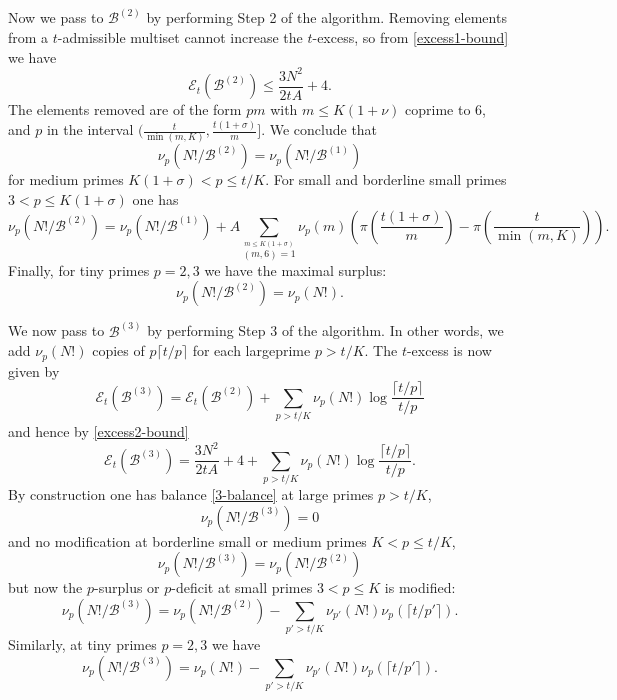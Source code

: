 \documentclass[12pt,a4paper,reqno]{amsart}
\numberwithin{equation}{section}
\theoremstyle{plain}
\theoremstyle{definition}
\newcommand\tuple{{\mathcal B}}
\newcommand\excess{{\mathcal{E}}}
\begin{document}
Now we pass to $\tuple^{(2)}$ by performing Step 2 of the algorithm.  Removing elements from a $t$-admissible multiset cannot increase the $t$-excess, so from \eqref{excess1-bound} we have
\begin{equation}\label{excess2-bound} 
  \excess_t(\tuple^{(2)}) \leq \frac{3N^2}{2tA} + 4.
\end{equation}
The elements removed are of the form $pm$ with $m \leq K(1+\nu)$ coprime to $6$, and $p$ in the interval $(\frac{t}{\min(m,K)}, \frac{t(1+\sigma)}{m}]$.  We conclude that
\begin{equation}\label{nup-21}
   \nu_p( N!/\tuple^{(2)} ) = \nu_p( N!/\tuple^{(1)})
\end{equation}
for medium primes $K(1+\sigma) < p \leq t/K$.  For small and borderline small primes $3 < p \leq K(1+\sigma)$ one has
\begin{equation}\label{nup-2}
 \nu_p( N!/\tuple^{(2)} ) = \nu_p(N!/\tuple^{(1)}) + A \sum_{\stackrel{m \leq K(1+\sigma)}{(m,6)=1}} \nu_p(m) \left(\pi\left(\frac{t(1+\sigma)}{m}\right)
- \pi\left(\frac{t}{\min(m,K)}\right) \right).
\end{equation}
Finally, for tiny primes $p=2,3$ we have the maximal surplus:
$$ \nu_p(N!/\tuple^{(2)}) = \nu_p(N!).$$


We now pass to $\tuple^{(3)}$ by performing Step 3 of the algorithm.  In other words, we add $\nu_p(N!)$ copies of $p \lceil t/p\rceil$ for each largeprime $p > t/K$.  The $t$-excess is now given by
$$  \excess_t(\tuple^{(3)}) = \excess_t(\tuple^{(2)}) + \sum_{p > t/K} \nu_p(N!) \log \frac{\lceil t/p \rceil}{t/p}
$$
and hence by \eqref{excess2-bound}
\begin{equation}\label{excess-eq-alt}
\excess_t(\tuple^{(3)}) = \frac{3N^2}{2tA} + 4 + \sum_{p > t/K} \nu_p(N!) \log \frac{\lceil t/p \rceil}{t/p}.
\end{equation}
By construction one has balance \eqref{3-balance} at large primes $p>t/K$, 
\begin{equation}\label{3-balance}  
  \nu_p(N!/\tuple^{(3)}) = 0\end{equation}
and no modification at borderline small or medium primes $K < p \leq t/K$,
\begin{equation}\label{3-medium}  
  \nu_p(N!/\tuple^{(3)}) = \nu_p(N!/\tuple^{(2)})
\end{equation}
but now the $p$-surplus or $p$-deficit at small
 primes $3 < p \leq K$ is modified:
\begin{equation}\label{mod}
   \nu_p(N!/\tuple^{(3)}) = \nu_p(N!/\tuple^{(2)}) -
\sum_{p' > t/K} \nu_{p'}(N!) \nu_{p}(\lceil t/p' \rceil).\end{equation}
Similarly, at tiny primes $p=2,3$ we have
\begin{equation}\label{tinycon} \nu_p(N!/\tuple^{(3)}) = \nu_p(N!) -
\sum_{p' > t/K} \nu_{p'}(N!) \nu_{p}(\lceil t/p' \rceil).
\end{equation}
\end{document}
